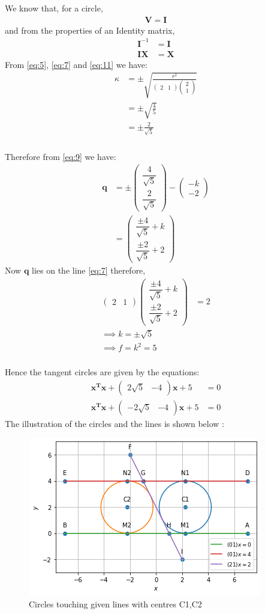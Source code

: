 \documentclass{beamer}
\newcommand{\myvec}[1]{\ensuremath{\begin{pmatrix}#1\end{pmatrix}}}
\renewcommand{\vec}[1]{\mathbf{#1}}
\begin{document}
\begin{frame}
\frametitle{}
We know that, for a circle, 
\begin{align}
\vec{V} = \vec{I}\label{eq:11}  
\end{align}
and from the properties of an Identity matrix, 
\begin{align}
\vec{I}^{-1} &= \vec{I} \\
\vec{I}\vec{X} &= \vec{X}   
\end{align}
From \eqref{eq:5}, \eqref{eq:7} and \eqref{eq:11} we have:
\begin{align}
\kappa &= \pm \sqrt{\frac{r^2}{\myvec{2 & 1 }\myvec{2 \\ 1 }}} \\
&= \pm \sqrt{\frac{4}{5}} \\
& =  \pm \frac{2}{\sqrt{5}}
\end{align}
\end{frame}

\begin{frame}
\frametitle{}
Therefore from \eqref{eq:9} we have:
\begin{align}
\vec{q} &= \pm \myvec{\dfrac{4}{\sqrt{5}} \\ \dfrac{2}{\sqrt{5}} } - \myvec{-k \\ -2} \\
&=\myvec{\dfrac{\pm 4}{\sqrt{5}} +k \\\dfrac{\pm 2}{\sqrt{5}} +2}
\end{align}
Now $\vec{q}$ lies on the line \eqref{eq:7} therefore,
\begin{align}
\myvec{2 & 1}\myvec{\dfrac{\pm 4}{\sqrt{5}} +k \\\dfrac{\pm 2}{\sqrt{5}} +2} &= 2 \\
\implies k = \pm \sqrt{5}\\
\implies f = k^2 = 5
\end{align}
\end{frame}

\begin{frame}
\frametitle{}
Hence the tangent circles are given by the equations:
\begin{align}
\vec{x^T}\vec{x} + \myvec{2\sqrt{5} & -4}\vec{x} + 5 &= 0 \\
\vec{x^T}\vec{x} + \myvec{-2\sqrt{5} & -4}\vec{x} + 5 &= 0
\end{align}
The illustration of the circles and the lines is shown below :
\begin{figure}[!ht]
       \centering
    \includegraphics[width=0.6\columnwidth] {Assignment_3_Fig_1.png}
    \caption{Circles touching given lines with centres C1,C2}
    \label{Tangent circles to 3 given lines}
\end{figure}
\end{frame}
\end{document}
